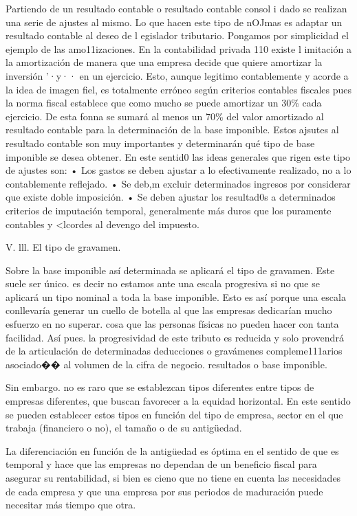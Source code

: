 \documentclass[10pt,a4paper]{article}
\begin{document}
Partiendo de un resultado contable o resultado contable consol i dado se realizan una serie de ajustes al mismo. Lo que hacen este tipo de nOJmas es adaptar un resultado contable al deseo de l egislador tributario. Pongamos por simplicidad el ejemplo de las amo11izaciones. En la contabilidad privada 110 existe l imitación a la amortización de manera que una empresa decide que quiere amortizar la inversión '·y·· en un ejercicio. Esto, aunque legitimo contablemente y acorde a la idea de imagen fiel, es totalmente erróneo según criterios contables fiscales pues la norma fiscal establece que como mucho se puede amortizar un 30\% cada ejercicio. De esta fonna se sumará al menos un 70\% del valor amortizado al resultado contable para la determinación de la base imponible. Estos ajsutes al resultado contable son muy importantes y determinarán qué tipo de base imponible se desea obtener. En este sentid0 las ideas generales que rigen este tipo de ajustes son:
• Los gastos se deben ajustar a lo efectivamente realizado, no a lo contablemente reflejado.
• Se deb,m excluir determinados ingresos por considerar que existe doble imposición. 
• Se deben ajustar los resultad0s a determinados criterios de imputación temporal, generalmente más duros que los puramente contables y <lcordes al devengo del impuesto. 



V. lll. El tipo de gravamen.

Sobre la base imponible así determinada se aplicará el tipo de gravamen. Este suele ser único. es decir no estamos ante una escala progresiva si no que se aplicará un tipo nominal a toda la base imponible. Esto es así porque una escala conllevaría generar un cuello de botella al que las empresas dedicarían mucho esfuerzo en no superar. cosa que las personas físicas no pueden hacer
con tanta facilidad. Así pues. la progresividad de este tributo es reducida y solo provendrá de la articulación de determinadas deducciones o gravámenes compleme111arios asociado�� al volumen de la cifra de negocio. resultados o base imponible.

Sin embargo. no es raro que se establezcan tipos diferentes entre tipos de empresas diferentes, que buscan favorecer a la equidad horizontal. En este sentido se pueden establecer estos tipos en función del tipo de empresa, sector en el que trabaja (financiero o no), el tamaño o de su antigüedad.

La diferenciación en función de la antigüedad es óptima en el sentido de que es temporal y hace que las empresas no dependan de un beneficio fiscal para asegurar su rentabilidad, si bien es cieno que no tiene en cuenta las necesidades de cada empresa y que una empresa por sus periodos de maduración puede necesitar más tiempo que otra.
\end{document}
